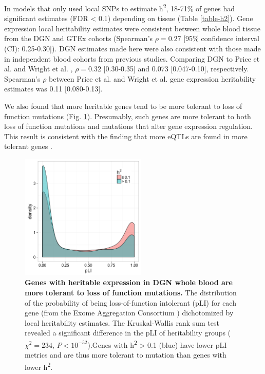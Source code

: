 \documentclass[10pt,letterpaper]{article}
\begin{document}
In models that only used local SNPs to estimate h\textsuperscript{2}, 18-71\% of genes had significant estimates (FDR \textless{} 0.1) depending on tissue (Table \ref{table-h2}). Gene expression local heritability estimates were consistent between whole blood tissue from the DGN and GTEx cohorts (Spearman's $\rho = 0.27$ [95\% confidence interval (CI): 0.25-0.30]). DGN estimates made here were also consistent with those made in independent blood cohorts from previous studies. Comparing DGN to Price et al. \cite{Price_2011} and Wright et al. \cite{Wright_2014}, $\rho = 0.32$ [0.30-0.35] and 0.073 [0.047-0.10], respectively. Spearman's $\rho$ between Price et al. \cite{Price_2011} and Wright et al. \cite{Wright_2014} gene expression heritability estimates was 0.11 [0.080-0.13].

We also found that more heritable genes tend to be more tolerant to loss of function mutations (Fig. \ref{fig-pli-h2}). Presumably, such genes are more tolerant to both loss of function mutations and mutations that alter gene expression regulation. This result is consistent with the finding that more eQTLs are found in more tolerant genes \cite{lek2016analysis}.


\begin{figure}[H]
\includegraphics[width=6cm]{Figures/pLI-by-h2.png}
\caption{{\bf Genes with heritable expression in DGN whole blood are more tolerant to loss of function mutations.} 
The distribution of the probability of being loss-of-function intolerant (pLI) for each gene (from the Exome Aggregation Consortium \cite{lek2016analysis}) dichotomized by local heritability estimates. The Kruskal-Wallis rank sum test revealed a significant difference in the pLI of heritability groups ($\chi^2 = 234$, $P < 10^{-52}$).Genes with h\textsuperscript{2} \textgreater{} 0.1 (blue) have lower pLI metrics and are thus more tolerant to mutation than genes with lower h\textsuperscript{2}.
}
\label{fig-pli-h2}
\end{figure}
\end{document}
